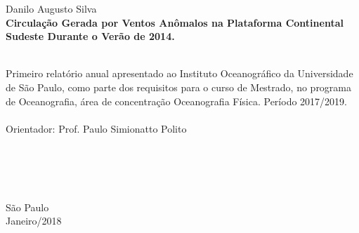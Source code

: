 \documentclass[a4paper, 11pt, oneside]{Thesis}  %
\begin{document}
\begin{center}
\thispagestyle{empty}
\Large Danilo Augusto Silva \\[3.5cm] 
\textbf{\huge Circulação Gerada por Ventos Anômalos na Plataforma Continental Sudeste Durante o Verão de 2014. } 
\ \\ \ 

\bigskip\bigskip\bigskip\bigskip\bigskip\bigskip\bigskip\bigskip

\begin{flushright}
  \begin{minipage}{8cm}
  \small Primeiro relatório anual apresentado ao Instituto Oceanográfico da Universidade de São Paulo, como parte dos requisitos
  para o curso de Mestrado, no programa de Oceanografia, área de concentração Oceanografia Física. Período 2017/2019. \\ \ \\
  Orientador: Prof. Paulo Simionatto Polito\\ \ \\ \ \\ \ \\
  \end{minipage}
\end{flushright}

\ \\[3cm] São Paulo \\ Janeiro/2018
\end{center} 
 

\tableofcontents  %

\listoffigures  %

\listoftables  %


\mainmatter	  %
\pagestyle{fancy}  %
\end{document}
